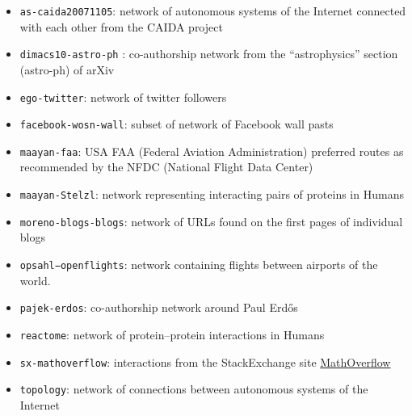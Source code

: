 \documentclass[
  sn-basic,
]{sn-jnl}
\providecommand{\tightlist}{%
  \setlength{\itemsep}{0pt}\setlength{\parskip}{0pt}}\usepackage{longtable,booktabs,array}
\theoremstyle{plain}
\theoremstyle{plain}
\theoremstyle{remark}
\begin{document}
\begin{itemize}
\tightlist
\item
  \texttt{as-caida20071105}: network of autonomous systems of the
  Internet connected with each other from the CAIDA project
\item
  \texttt{dimacs10-astro-ph} : co-authorship network from the
  ``astrophysics'' section (astro-ph) of arXiv
\item
  \texttt{ego-twitter}: network of twitter followers
\item
  \texttt{facebook-wosn-wall}: subset of network of Facebook wall pasts
\item
  \texttt{maayan-faa}: USA FAA (Federal Aviation Administration)
  preferred routes as recommended by the NFDC (National Flight Data
  Center)
\item
  \texttt{maayan-Stelzl}: network representing interacting pairs of
  proteins in Humans
\item
  \texttt{moreno-blogs-blogs}: network of URLs found on the first pages
  of individual blogs
\item
  \texttt{opsahl−openflights}: network containing flights between
  airports of the world.
\item
  \texttt{pajek-erdos}: co-authorship network around Paul Erdős
\item
  \texttt{reactome}: network of protein--protein interactions in Humans
\item
  \texttt{sx-mathoverflow}: interactions from the StackExchange site
  \href{https://mathoverflow.net/}{MathOverflow}
\item
  \texttt{topology}: network of connections between autonomous systems
  of the Internet
\end{itemize}
\end{document}
